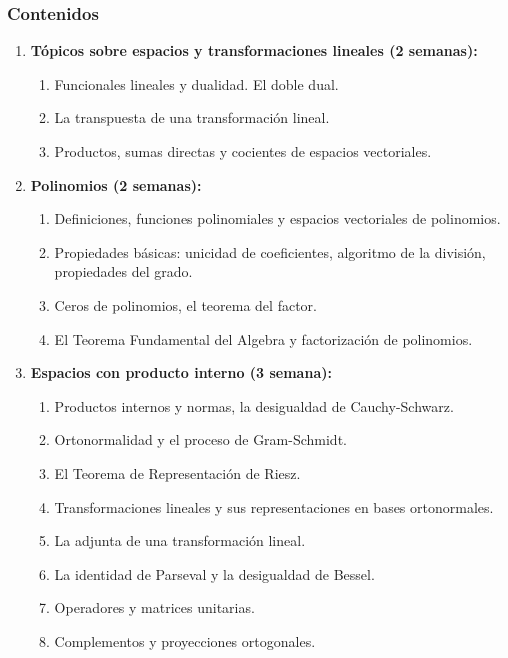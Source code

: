 \begin{refsection}
\subsubsection*{Contenidos}

\begin{enumerate}
\item \textbf{Tópicos sobre espacios y transformaciones lineales (2 semanas):} 
\begin{enumerate}
    \item Funcionales lineales y dualidad. El doble dual.
    \item La transpuesta de una transformación lineal.
    \item Productos, sumas directas y cocientes de espacios vectoriales.
\end{enumerate}

\item \textbf{Polinomios (2 semanas):} 
\begin{enumerate}
    \item Definiciones, funciones polinomiales y espacios vectoriales de polinomios.
    \item Propiedades básicas: unicidad de coeficientes, algoritmo de la división, propiedades del grado.
    \item Ceros de polinomios, el teorema del factor.
    \item El Teorema Fundamental del Algebra y factorización de polinomios.
\end{enumerate}

\item \textbf{Espacios con producto interno (3 semana):} 
\begin{enumerate}
    \item Productos internos y normas, la desigualdad de Cauchy-Schwarz.
    \item Ortonormalidad y el proceso de Gram-Schmidt.
    \item El Teorema de Representación de Riesz.
    \item Transformaciones lineales y sus representaciones en bases ortonormales.
    \item La adjunta de una transformación lineal.
    \item La identidad de Parseval y la desigualdad de Bessel.
    \item Operadores y matrices unitarias.
    \item Complementos y proyecciones ortogonales.
\end{enumerate}


\end{enumerate}
\end{refsection}
